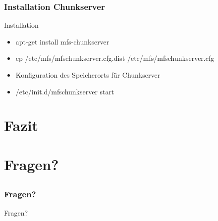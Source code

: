 \documentclass{beamer}
\begin{document}
\begin{frame}
	\frametitle{Installation Chunkserver}
	\begin{block}{Installation}
	\begin{itemize}
		\item apt-get install mfs-chunkserver
		\item cp /etc/mfs/mfschunkserver.cfg.dist /etc/mfs/mfschunkserver.cfg
		\item Konfiguration des Speicherorts f\"ur Chunkserver
		\item /etc/init.d/mfschunkserver start
	\end{itemize}
	\end{block}
\end{frame}	


\section{Fazit}
\subsection*{}

\section{Fragen?}
\subsection*{}

\begin{frame}
	
	\frametitle{Fragen?}
	\begin{center}
		\large Fragen?
	\end{center}
\end{frame}
\end{document}

